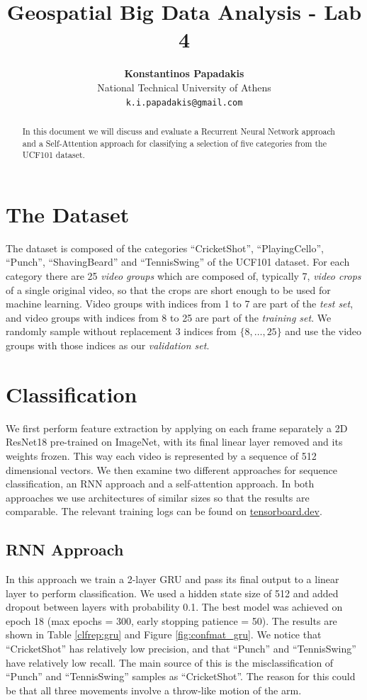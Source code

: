 \documentclass{article}
\title{Geospatial Big Data Analysis - Lab 4}
\author{
    \textbf{Konstantinos Papadakis}\\
    National Technical University of Athens\\
    \texttt{k.i.papadakis@gmail.com}
}
\date{\vspace{-5ex}}
\begin{document}
\maketitle

\begin{abstract}
    In this document we will discuss and evaluate a Recurrent Neural Network approach and a Self-Attention approach for classifying a selection of five categories from the UCF101 dataset.
\end{abstract}

\section{The Dataset}
The dataset is composed of the categories “CricketShot”, “PlayingCello”, “Punch”, “ShavingBeard” and “TennisSwing” of the UCF101 dataset. For each category there are 25 \emph{video groups} which are composed of, typically 7, \emph{video crops} of a single original video, so that the crops are short enough to be used for machine learning. Video groups with indices from 1 to 7 are part of the \emph{test set}, and video groups with indices from 8 to 25 are part of the \emph{training set}. We randomly sample without replacement 3 indices from \(\{8, \dots , 25\}\) and use the video groups with those indices as our \emph{validation set}.

\section{Classification}
We first perform feature extraction by applying on each frame separately a 2D ResNet18 pre-trained on ImageNet, with its final linear layer removed and its weights frozen. This way each video is represented by a sequence of 512 dimensional vectors. We then examine two different approaches for sequence classification, an RNN approach and a self-attention approach. In both approaches we use architectures of similar sizes so that the results are comparable. The relevant training logs can be found on \href{https://tensorboard.dev/experiment/Xqk1NcDEQBSwa6wCmmAh8w/}{tensorboard.dev}.

\subsection{RNN Approach}
In this approach we train a 2-layer GRU and pass its final output to a linear layer to perform classification. We used a hidden state size of 512 and added dropout between layers with probability 0.1. The best model was achieved on epoch 18 (max epochs = 300, early stopping patience = 50). The results are shown in Table \ref{clfrep:gru} and Figure \ref{fig:confmat_gru}. We notice that “CricketShot” has relatively low precision, and that “Punch” and “TennisSwing” have relatively low recall. The main source of this is the misclassification of “Punch” and “TennisSwing” samples as “CricketShot”. The reason for this could be that all three movements involve a throw-like motion of the arm.
\end{document}
